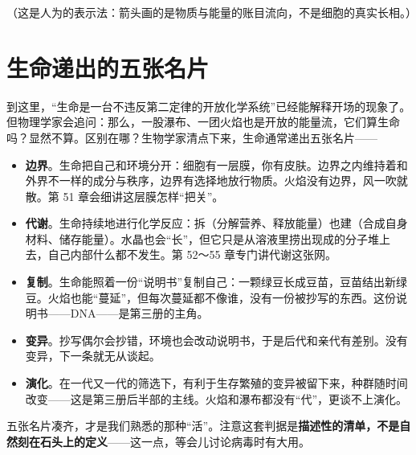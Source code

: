 \begin{center}
\end{center}

（这是人为的表示法：箭头画的是物质与能量的账目流向，不是细胞的真实长相。）

\section{生命递出的五张名片}

到这里，“生命是一台不违反第二定律的开放化学系统”已经能解释开场的现象了。但物理学家会追问：那么，一股瀑布、一团火焰也是开放的能量流，它们算生命吗？显然不算。区别在哪？生物学家清点下来，生命通常递出五张名片——

\begin{itemize}[itemsep=2pt]
\item \textbf{边界}。生命把自己和环境分开：细胞有一层膜，你有皮肤。边界之内维持着和外界不一样的成分与秩序，边界有选择地放行物质。火焰没有边界，风一吹就散。第 51 章会细讲这层膜怎样“把关”。
\item \textbf{代谢}。生命持续地进行化学反应：拆（分解营养、释放能量）也建（合成自身材料、储存能量）。水晶也会“长”，但它只是从溶液里捞出现成的分子堆上去，自己内部什么都不发生。第 52～55 章专门讲代谢这张网。
\item \textbf{复制}。生命能照着一份“说明书”复制自己：一颗绿豆长成豆苗，豆苗结出新绿豆。火焰也能“蔓延”，但每次蔓延都不像谁，没有一份被抄写的东西。这份说明书——DNA——是第三册的主角。
\item \textbf{变异}。抄写偶尔会抄错，环境也会改动说明书，于是后代和亲代有差别。没有变异，下一条就无从谈起。
\item \textbf{演化}。在一代又一代的筛选下，有利于生存繁殖的变异被留下来，种群随时间改变——这是第三册后半部的主线。火焰和瀑布都没有“代”，更谈不上演化。
\end{itemize}

五张名片凑齐，才是我们熟悉的那种“活”。注意这套判据是\textbf{描述性的清单，不是自然刻在石头上的定义}——这一点，等会儿讨论病毒时有大用。

